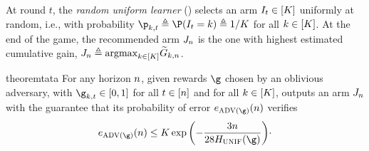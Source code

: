 At round $t$, the \emph{random uniform  learner} (\RULE{}) 
selects an arm $I_t\in [K]$ uniformly at random, i.e., 
with probability $\learnerDist_{k,t}\triangleq\Pro(\pulledArm_t=k)
\triangleq 1/\nArms$ for all $k\in[K]$.
At the end of the game, the recommended 
arm $J_n$ is the one with highest 
estimated  
cumulative gain, 
$J_n \triangleq \mathrm{argmax}_{k\in[K]}
\widetilde{G}_{k,n}$. 
%
\begin{restatable}{theorem}{tata}\label{th:UPARU}
	For any horizon $n$, given rewards $\gainVector$ 
	chosen by an oblivious adversary, with $\gainVector_{k,t}\in [0,1]$ 
	for all $t\in[n]$ and for all $k\in[K]$, \RULE{}  
	outputs an arm $J_n$
	with the guarantee that its probability of error 
	$\ProErr_{\advPro(\gainVector)}(\timeHorizon)$ verifies    
	\[
	\ProErr_{\advPro(\gainVector)}(\timeHorizon)
	\leq
	\nArms\exp\left(-\frac{3\timeHorizon}{28\complexityUnif(\gainVector)}\right)\!\cdot
	\]
\end{restatable}
%

